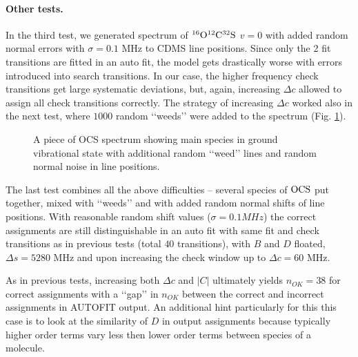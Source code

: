 \documentclass[11pt]{article}
\begin{document}
\paragraph{Other tests.}
In the third test, we generated spectrum of $\rm ^{16}O^{12}C^{32}S$ $v = 0$ with added random normal errors with $\sigma = 0.1$ MHz to CDMS line positions. %
Since only the 2 fit transitions are fitted in an auto fit, the model gets drastically worse with errors introduced into search transitions. In our case, the higher frequency check transitions get large systematic deviations, but, again, increasing $\Delta c$ allowed to assign all check transitions correctly. The strategy of increasing $\Delta c$ worked also in the next test, where $1000$ random \lq\lq{}weeds\rq\rq{} were added to the spectrum (Fig. \ref{fig:weeds}).

\begin{figure}[h]
\caption{\small A piece of OCS spectrum showing main species in ground vibrational state with additional random \lq\lq{}weed\rq\rq{} lines and random normal noise in line positions.}
\label{fig:weeds}
\end{figure}

The last test combines all the above difficulties -- several species of $\rm OCS$ put together, mixed with \lq\lq{}weeds\rq\rq{} and with added random normal shifts of line positions. With reasonable random shift values ($\sigma = 0.1 MHz$) the correct assignments are still distinguishable in an auto fit with same fit and check transitions as in previous tests (total $40$ transitions), with $B$ and $D$ floated, $\Delta s = 5280$ MHz and upon increasing the check window up to $\Delta c = 60$ MHz. 

As in previous tests, increasing both $\Delta c$ and $|C|$ ultimately yields $n_{OK} = 38$ for correct assignments with a  \lq\lq{}gap\rq\rq{} in $n_{OK}$ between the correct and incorrect assignments in AUTOFIT output. An additional hint particularly for this this case is to look at the similarity of $D$ in output assignments because typically higher order terms vary less then lower order terms between species of a molecule.
\end{document}
